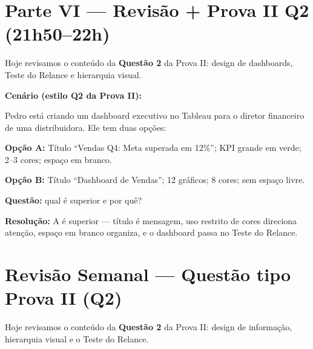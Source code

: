 \section{Parte VI — Revisão + Prova II Q2 (21h50–22h)}

\begin{NoteBox}
Hoje revisamos o conteúdo da \textbf{Questão 2} da Prova II:
design de dashboards, Teste do Relance e hierarquia visual.
\end{NoteBox}

\begin{SolvedBox}
\textbf{Cenário (estilo Q2 da Prova II):}

Pedro está criando um dashboard executivo no Tableau para o diretor
financeiro de uma distribuidora. Ele tem duas opções:

\textbf{Opção A:} Título ``Vendas Q4: Meta superada em 12\%'';
KPI grande em verde; 2--3 cores; espaço em branco.

\textbf{Opção B:} Título ``Dashboard de Vendas''; 12 gráficos;
8 cores; sem espaço livre.

\textbf{Questão:} qual é superior e por quê?

\textbf{Resolução:} A é superior — título é mensagem, uso restrito
de cores direciona atenção, espaço em branco organiza, e o dashboard
passa no Teste do Relance.
\end{SolvedBox}

\section{Revisão Semanal — Questão tipo Prova II (Q2)}

\begin{NoteBox}
Hoje revisamos o conteúdo da \textbf{Questão 2} da Prova II:
design de informação, hierarquia visual e o Teste do Relance.
\end{NoteBox}

